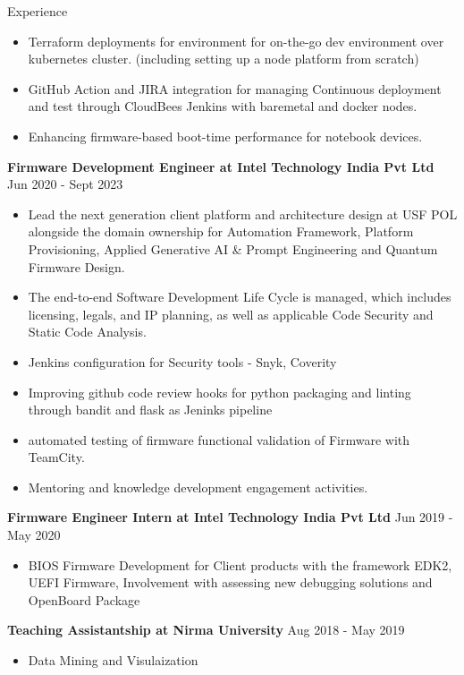 \documentclass{resume} %
\begin{document}
\begin{rSection}{Experience}
\begin{itemize}
\if{}
    \item Terraform deployments for environment for on-the-go dev environment over kubernetes cluster. (including setting up a node platform from scratch)
\fi
    \item GitHub Action and JIRA integration for managing Continuous deployment and test through CloudBees Jenkins with baremetal and docker nodes.
    \item Enhancing firmware-based boot-time performance for notebook devices.
\end{itemize}
 
{\textbf{Firmware Development Engineer at Intel Technology India Pvt Ltd}}  \hfill {Jun 2020 - Sept 2023}
\begin{itemize}
    \item Lead the next generation client platform and architecture design at USF POL alongside the domain ownership for Automation Framework, Platform Provisioning, Applied Generative AI \& Prompt Engineering and Quantum Firmware Design.
    \item The end-to-end Software Development Life Cycle is managed, which includes licensing, legals, and IP planning, as well as applicable Code Security and Static Code Analysis.
    \item Jenkins configuration for Security tools - Snyk, Coverity
    \item Improving github code review hooks for python packaging and linting through bandit and flask as Jeninks pipeline
    \item automated testing of firmware functional validation of Firmware with TeamCity.
    \item Mentoring and knowledge development engagement activities.
\end{itemize}

{\textbf{Firmware Engineer Intern at Intel Technology India Pvt Ltd}}  \hfill {Jun 2019 - May 2020}
\begin{itemize}
    \item BIOS Firmware Development for Client products with the framework EDK2, UEFI Firmware, Involvement with assessing new debugging solutions and OpenBoard Package
\end{itemize}

\if{}
{\textbf{Teaching Assistantship at Nirma University}}  \hfill {Aug 2018 - May 2019}
\begin{itemize}
    \item Data Mining and Visulaization
\end{itemize}
\fi


\end{rSection}
\end{document}
